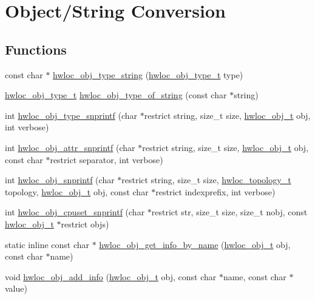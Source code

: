 \hypertarget{a00048}{
\section{Object/String Conversion}
\label{a00048}
}
\subsection*{Functions}
\begin{DoxyCompactItemize}
\item 
 const char $\ast$ \hyperlink{a00048_ga7c61920feca6fd9006d930dabfc09058}{hwloc\_\-obj\_\-type\_\-string} (\hyperlink{a00041_gacd37bb612667dc437d66bfb175a8dc55}{hwloc\_\-obj\_\-type\_\-t} type) 
\item 
 \hyperlink{a00041_gacd37bb612667dc437d66bfb175a8dc55}{hwloc\_\-obj\_\-type\_\-t} \hyperlink{a00048_gade722091ae392fdc79557e797a16c370}{hwloc\_\-obj\_\-type\_\-of\_\-string} (const char $\ast$string) 
\item 
 int \hyperlink{a00048_ga3ad856e8f3487d340c82a23b8a2a0351}{hwloc\_\-obj\_\-type\_\-snprintf} (char $\ast$restrict string, size\_\-t size, \hyperlink{a00016}{hwloc\_\-obj\_\-t} obj, int verbose)
\item 
 int \hyperlink{a00048_ga0db8286d7f3ceda8defd76e3e1e2b284}{hwloc\_\-obj\_\-attr\_\-snprintf} (char $\ast$restrict string, size\_\-t size, \hyperlink{a00016}{hwloc\_\-obj\_\-t} obj, const char $\ast$restrict separator, int verbose)
\item 
 int \hyperlink{a00048_ga5c6a61a83f4790b421e2f62e9088446f}{hwloc\_\-obj\_\-snprintf} (char $\ast$restrict string, size\_\-t size, \hyperlink{a00039_ga9d1e76ee15a7dee158b786c30b6a6e38}{hwloc\_\-topology\_\-t} topology, \hyperlink{a00016}{hwloc\_\-obj\_\-t} obj, const char $\ast$restrict indexprefix, int verbose)
\item 
 int \hyperlink{a00048_gabbfb92224c992c0e2ecef6b6e45260f2}{hwloc\_\-obj\_\-cpuset\_\-snprintf} (char $\ast$restrict str, size\_\-t size, size\_\-t nobj, const \hyperlink{a00016}{hwloc\_\-obj\_\-t} $\ast$restrict objs)
\item 
static inline const char $\ast$ \hyperlink{a00048_ga2a12b2450489675bd5759dc47cbc51ed}{hwloc\_\-obj\_\-get\_\-info\_\-by\_\-name} (\hyperlink{a00016}{hwloc\_\-obj\_\-t} obj, const char $\ast$name) 
\item 
 void \hyperlink{a00048_gaba3afe636940872772ed6dfaf0b3552e}{hwloc\_\-obj\_\-add\_\-info} (\hyperlink{a00016}{hwloc\_\-obj\_\-t} obj, const char $\ast$name, const char $\ast$value)
\end{DoxyCompactItemize}


